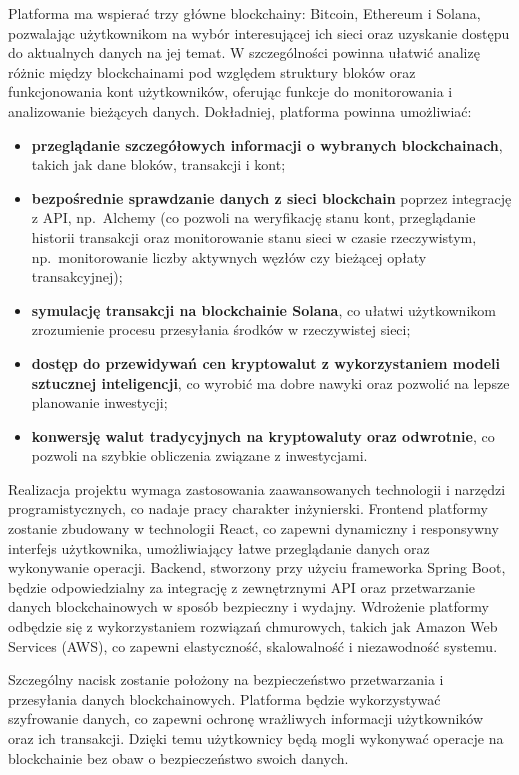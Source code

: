 Platforma ma wspierać trzy główne blockchainy: Bitcoin, Ethereum i Solana, pozwalając użytkownikom na wybór interesującej ich sieci oraz uzyskanie dostępu do aktualnych danych na jej temat. W szczególności powinna ułatwić analizę różnic między blockchainami pod względem struktury bloków oraz funkcjonowania kont użytkowników, oferując funkcje do monitorowania i analizowanie bieżących danych. Dokładniej, platforma powinna umożliwiać:
\begin{itemize}
\item \textbf{przeglądanie szczegółowych informacji o wybranych blockchainach}, takich jak dane bloków, transakcji i kont; 
\item \textbf{bezpośrednie sprawdzanie danych z sieci blockchain} poprzez integrację z API, np.\ Alchemy (co pozwoli na weryfikację stanu kont, przeglądanie historii transakcji oraz monitorowanie stanu sieci  w czasie rzeczywistym, np.\ monitorowanie liczby aktywnych węzłów czy bieżącej opłaty transakcyjnej);
\item \textbf{symulację transakcji na blockchainie Solana}, co ułatwi użytkownikom zrozumienie procesu przesyłania środków w rzeczywistej sieci;
\item \textbf{dostęp do przewidywań cen kryptowalut z wykorzystaniem modeli sztucznej inteligencji}, co wyrobić ma dobre nawyki oraz pozwolić na lepsze planowanie inwestycji;
\item \textbf{konwersję walut tradycyjnych na kryptowaluty oraz odwrotnie}, co pozwoli na szybkie obliczenia związane z inwestycjami. 
\end{itemize}

Realizacja projektu wymaga zastosowania zaawansowanych technologii i narzędzi programistycznych, co nadaje pracy charakter inżynierski. Frontend platformy zostanie zbudowany w technologii React, co zapewni dynamiczny i responsywny interfejs użytkownika, umożliwiający łatwe przeglądanie danych oraz wykonywanie operacji. Backend, stworzony przy użyciu frameworka Spring Boot, będzie odpowiedzialny za integrację z zewnętrznymi API oraz przetwarzanie danych blockchainowych w sposób bezpieczny i wydajny. Wdrożenie platformy odbędzie się z wykorzystaniem rozwiązań chmurowych, takich jak Amazon Web Services (AWS), co zapewni elastyczność, skalowalność i niezawodność systemu.

Szczególny nacisk zostanie położony na bezpieczeństwo przetwarzania i przesyłania danych blockchainowych. Platforma będzie wykorzystywać szyfrowanie danych, co zapewni ochronę wrażliwych informacji użytkowników oraz ich transakcji. Dzięki temu użytkownicy będą mogli wykonywać operacje na blockchainie bez obaw o bezpieczeństwo swoich danych.

